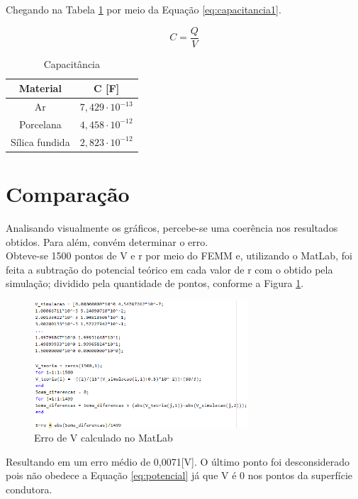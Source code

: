 \documentclass[a4paper]{article}
\begin{document}
\begin{multicols}{2}
	Chegando na Tabela \ref{tab:capacitancia1} por meio da Equação \ref{eq:capacitancia1}.
	
	\begin{equation} \label{eq:capacitancia1}
		\boxed{C=\frac{Q}{V}}
	\end{equation}

	\begin{table} [H]
		\centering
		\caption{Capacitância\label{tab:capacitancia1}}
		\begin{tabular}{|c|c|}
			\hline
			Material & C [F] \\
			\hline
			Ar & $7,429\cdot10^{-13}$ \\
			\hline
			Porcelana & $4,458\cdot10^{-12}$ \\
			\hline
			Sílica fundida & $2,823\cdot 10^{-12}$ \\
			\hline
		\end{tabular}
	\end{table}
	
	\section{Comparação} \label{sec:comparacao}
	Analisando visualmente os gráficos, percebe-se uma coerência nos resultados obtidos. Para além, convém determinar o erro.\\
	
	Obteve-se 1500 pontos de V e r por meio do FEMM e, utilizando o MatLab, foi feita a subtração do potencial teórico em cada valor de r com o obtido pela simulação; dividido pela quantidade de pontos, conforme a Figura \ref{fig:potencialerro}.
	
	\begin{figure} [H] 
		\centering
		\caption{Erro de V calculado no MatLab\label{fig:potencialerro}}
		\includegraphics[width=8cm ,fbox]{latex/matlab.png}
	\end{figure}

	Resultando em um erro médio de 0,0071[V]. O último ponto foi desconsiderado pois não obedece a Equação \ref{eq:potencial} já que V é 0 nos pontos da superfície condutora.\\
	

\end{multicols}
\end{document}
